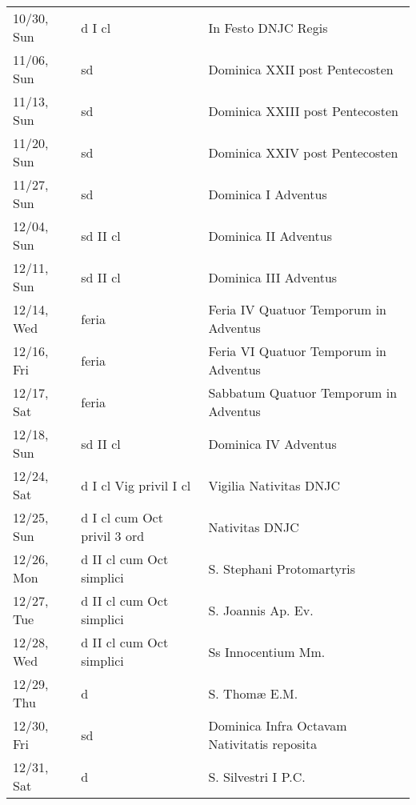 \documentclass{article}
\begin{document}
\begin{longtable}{ l l l }
10/30, Sun & d I cl & In Festo DNJC Regis\\
11/06, Sun & sd & Dominica XXII post Pentecosten\\
11/13, Sun & sd & Dominica XXIII post Pentecosten\\
11/20, Sun & sd & Dominica XXIV post Pentecosten\\
11/27, Sun & sd & Dominica I Adventus\\
12/04, Sun & sd II cl & Dominica II Adventus\\
12/11, Sun & sd II cl & Dominica III Adventus\\
12/14, Wed & feria & Feria IV Quatuor Temporum in Adventus\\
12/16, Fri & feria & Feria VI Quatuor Temporum in Adventus\\
12/17, Sat & feria & Sabbatum Quatuor Temporum in Adventus\\
12/18, Sun & sd II cl & Dominica IV Adventus\\
12/24, Sat & d I cl Vig privil I cl & Vigilia Nativitas DNJC\\
12/25, Sun & d I cl cum Oct privil 3 ord & Nativitas DNJC\\
12/26, Mon & d II cl cum Oct simplici & S. Stephani Protomartyris\\
12/27, Tue & d II cl cum Oct simplici & S. Joannis Ap. Ev.\\
12/28, Wed & d II cl cum Oct simplici & Ss Innocentium Mm.\\
12/29, Thu & d & S. Thomæ E.M.\\
12/30, Fri & sd & Dominica Infra Octavam Nativitatis reposita\\
12/31, Sat & d & S. Silvestri I P.C.\\
\end{longtable}
\end{document}
